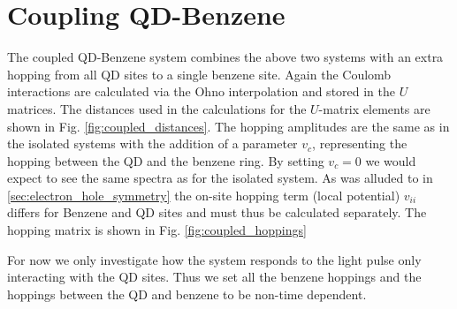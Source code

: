 \section{Coupling QD-Benzene}
    The coupled QD-Benzene system combines the above two systems with an extra hopping from all QD sites to a single benzene site. Again the Coulomb interactions are calculated via the Ohno interpolation and stored in the $U$ matrices. The distances used in the calculations for the $U$-matrix elements are shown in Fig. \ref{fig:coupled_distances}. The hopping amplitudes are the same as in the isolated systems with the addition of a parameter $v_c$, representing the hopping between the QD and the benzene ring. By setting $v_c = 0$ we would expect to see the same spectra as for the isolated system. As was alluded to in \ref{sec:electron_hole_symmetry} the on-site hopping term (local potential) $v_{ii}$ differs for Benzene and QD sites and must thus be calculated separately. The hopping matrix is shown in Fig. \ref{fig:coupled_hoppings}
    \medskip
    
    For now we only investigate how the system responds to the light pulse only interacting with the QD sites. Thus we set all the benzene hoppings and the hoppings between the QD and benzene to be non-time dependent.

\usetikzlibrary{matrix, positioning}

\newcommand{\my}{|[fill=myellow]|}
\renewcommand{\mg}{|[fill=mgreen]|}

